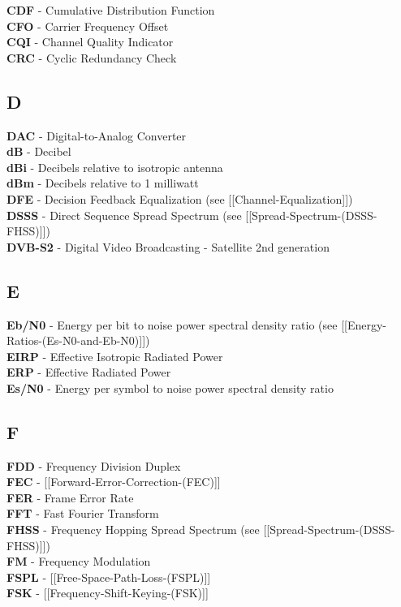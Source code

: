 \textbf{CDF} - Cumulative Distribution Function\\
\textbf{CFO} - Carrier Frequency Offset\\
\textbf{CQI} - Channel Quality Indicator\\
\textbf{CRC} - Cyclic Redundancy Check

\subsection{D}\label{d}

\textbf{DAC} - Digital-to-Analog Converter\\
\textbf{dB} - Decibel\\
\textbf{dBi} - Decibels relative to isotropic antenna\\
\textbf{dBm} - Decibels relative to 1 milliwatt\\
\textbf{DFE} - Decision Feedback Equalization (see
{[}{[}Channel-Equalization{]}{]})\\
\textbf{DSSS} - Direct Sequence Spread Spectrum (see
{[}{[}Spread-Spectrum-(DSSS-FHSS){]}{]})\\
\textbf{DVB-S2} - Digital Video Broadcasting - Satellite 2nd generation

\subsection{E}\label{e}

\textbf{Eb/N0} - Energy per bit to noise power spectral density ratio
(see {[}{[}Energy-Ratios-(Es-N0-and-Eb-N0){]}{]})\\
\textbf{EIRP} - Effective Isotropic Radiated Power\\
\textbf{ERP} - Effective Radiated Power\\
\textbf{Es/N0} - Energy per symbol to noise power spectral density ratio

\subsection{F}\label{f}

\textbf{FDD} - Frequency Division Duplex\\
\textbf{FEC} - {[}{[}Forward-Error-Correction-(FEC){]}{]}\\
\textbf{FER} - Frame Error Rate\\
\textbf{FFT} - Fast Fourier Transform\\
\textbf{FHSS} - Frequency Hopping Spread Spectrum (see
{[}{[}Spread-Spectrum-(DSSS-FHSS){]}{]})\\
\textbf{FM} - Frequency Modulation\\
\textbf{FSPL} - {[}{[}Free-Space-Path-Loss-(FSPL){]}{]}\\
\textbf{FSK} - {[}{[}Frequency-Shift-Keying-(FSK){]}{]}


